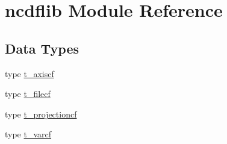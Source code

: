 \hypertarget{namespacencdflib}{}\section{ncdflib Module Reference}
\label{namespacencdflib}
\subsection*{Data Types}
\begin{DoxyCompactItemize}
\item 
type \mbox{\hyperlink{structncdflib_1_1t__axiscf}{t\+\_\+axiscf}}
\item 
type \mbox{\hyperlink{structncdflib_1_1t__filecf}{t\+\_\+filecf}}
\item 
type \mbox{\hyperlink{structncdflib_1_1t__projectioncf}{t\+\_\+projectioncf}}
\item 
type \mbox{\hyperlink{structncdflib_1_1t__varcf}{t\+\_\+varcf}}
\end{DoxyCompactItemize}
